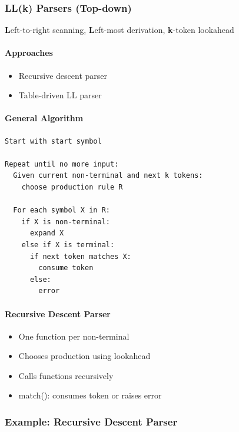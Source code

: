 \documentclass{article}
\begin{document}

\subsubsection{LL(k) Parsers (Top-down)}

\textbf{L}eft-to-right scanning, \textbf{L}eft-most derivation, \textbf{k}-token lookahead

\paragraph{Approaches}
\begin{itemize}
  \item Recursive descent parser
  \item Table-driven LL parser
\end{itemize}

\paragraph{General Algorithm}
\begin{lstlisting}
Start with start symbol

Repeat until no more input:
  Given current non-terminal and next k tokens:
    choose production rule R

  For each symbol X in R:
    if X is non-terminal:
      expand X
    else if X is terminal:
      if next token matches X:
        consume token
      else:
        error
\end{lstlisting}

\paragraph{Recursive Descent Parser}
\begin{itemize}
  \item One function per non-terminal
  \item Chooses production using lookahead
  \item Calls functions recursively
  \item match(): consumes token or raises error
\end{itemize}

\subsubsection{Example: Recursive Descent Parser}
\end{document}
